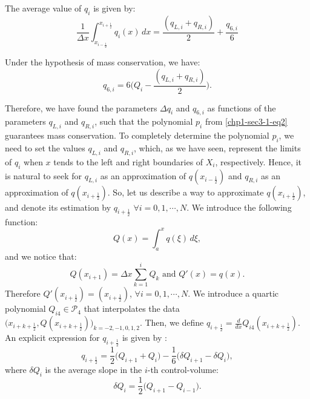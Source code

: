 The average value of $q_i$ is given by:
\begin{equation}
	\label{chp1-sec-recon-ppm-eq3}
	\frac{1}{\Delta x}\int_{x_{i-\frac{1}{2}}}^{x_{i+\frac{1}{2}}} {q}_i(x) \,dx
	= \frac{(q_{L,i} + q_{R,i})}{2} + \frac{q_{6,i}}{6}
\end{equation}

Under the hypothesis of mass conservation, we have:
\begin{equation}
	\label{chp1-sec-recon-ppm-eq4}
	q_{6,i} = 6\bigg(Q_i - \frac{(q_{L,i} + q_{R,i})}{2}\bigg).
\end{equation}

Therefore, we have found the parameters $\Delta q_i$ and $q_{6, i}$ as
functions of the parameters $q_{L, i}$ and $q_{R, i}$,
such that the polynomial $p_i$ from \eqref{chp1-sec3-1-eq2} 
guarantees mass conservation. To completely determine the 
polynomial $p_i$, we need to set the values $q_{L, i}$ and
$q_{R, i}$, which, as we have seen, represent the limits of $q_i$ when
$x$ tends to the left and right boundaries of $X_i$, respectively.
Hence, it is natural to seek for $q_{L, i}$ as an approximation of $q(x_{i-\frac{1}{2}})$
and $q_{R, i}$ as an approximation of $q(x_{i+\frac{1}{2}})$.
So, let us describe a way to approximate $q(x_{i+\frac{1}{2}})$, and denote its estimation by
$q_{i+\frac{1}{2}}$ $\forall i = 0, 1, \cdots, N$.
We introduce the following function:
\begin{equation}
	\label{chp1-sec-recon-ppm-eq5}
	Q(x) = \int_{a}^{x} q(\xi) \,d\xi,
\end{equation}
and we notice that:
\begin{equation}
	\label{chp1-sec-recon-ppm-eq6}
	Q(x_{i+1}) = \Delta x \sum_{k=1}^{i} Q_k \text{ and } Q'(x) = q(x).
\end{equation}
Therefore $Q'(x_{i+\frac{1}{2}}) = (x_{i+\frac{1}{2}}) $, $\forall i = 0, 1, \cdots, N$.
We introduce a quartic polynomial $Q_{i4} \in \mathcal{P}_4$ that interpolates the data
$\big(x_{i+k+\frac{1}{2}}, Q(x_{i+k+\frac{1}{2}})\big)_{k=-2,-1,0,1,2}$. Then, we define
$q_{i+\frac{1}{2}} = \frac{d}{dx}Q_{i4}(x_{i+k+\frac{1}{2}})$.
An explicit expression for $q_{i+\frac{1}{2}}$ is given by \citep{colella:1984}:
\begin{equation}
	\label{chp1-sec-recon-ppm-eq7}
	q_{i+\frac{1}{2}} = \frac{1}{2} \bigg( Q_{i+1} + Q_{i} \bigg) - \frac{1}{6} \bigg( \delta Q_{i+1} - \delta Q_{i}\bigg),
\end{equation}
where $\delta Q_{i}$ is the average slope in the $i$-th control-volume:
\begin{equation}
	\label{chp1-sec-recon-ppm-eq8}
	\delta Q_{i} = \frac{1}{2} \bigg( Q_{i+1} - Q_{i-1} \bigg).
\end{equation}
